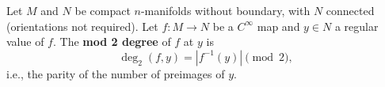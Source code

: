 Let $M$ and $N$ be compact $n$-manifolds without boundary, with $N$ connected (orientations not required). Let $f: M \to N$ be a $C^\infty$ map and $y \in N$ a regular value of $f$. The \textbf{mod 2 degree} of $f$ at $y$ is
$$
\deg_2(f, y) = |f^{-1}(y)| \pmod{2},
$$
i.e., the parity of the number of preimages of $y$.
